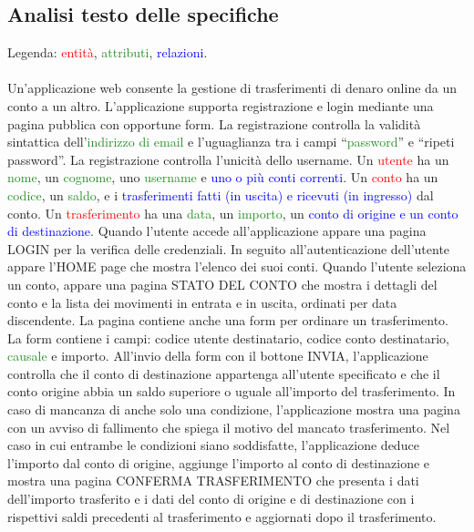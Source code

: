 \documentclass{article}
\begin{document}
\subsection{Analisi testo delle specifiche}
Legenda: \textcolor{red}{entità}, \textcolor{ForestGreen}{attributi}, \textcolor{blue}{relazioni}.
\\
\\
Un’applicazione web consente la gestione di trasferimenti di denaro online da un conto a un
altro. L’applicazione supporta registrazione e login mediante una pagina pubblica con
opportune form. La registrazione controlla la validità sintattica dell’\textcolor{ForestGreen}{indirizzo di email} e
l’uguaglianza tra i campi “\textcolor{ForestGreen}{password}” e “ripeti password”. La registrazione controlla l’unicità
dello username. Un \textcolor{red}{utente} ha un \textcolor{ForestGreen}{nome}, un \textcolor{ForestGreen}{cognome}, uno \textcolor{ForestGreen}{username} e \textcolor{blue}{uno o più conti correnti}.
Un \textcolor{red}{conto}  ha un \textcolor{ForestGreen}{codice}, un \textcolor{ForestGreen}{saldo}, e i \textcolor{blue}{trasferimenti fatti (in uscita) e ricevuti (in ingresso)} dal
conto. Un  \textcolor{red}{trasferimento} ha una \textcolor{ForestGreen}{data}, un \textcolor{ForestGreen}{importo}, un \textcolor{blue}{conto di origine e un conto di destinazione}.
Quando l’utente accede all’applicazione appare una pagina LOGIN per la verifica delle
credenziali. In seguito all’autenticazione dell’utente appare l’HOME page che mostra l’elenco
dei suoi conti. Quando l’utente seleziona un conto, appare una pagina STATO DEL CONTO
che mostra i dettagli del conto e la lista dei movimenti in entrata e in uscita, ordinati per data
discendente. La pagina contiene anche una form per ordinare un trasferimento. La form
contiene i campi: codice utente destinatario, codice conto destinatario, \textcolor{ForestGreen}{causale} e importo.
All’invio della form con il bottone INVIA, l’applicazione controlla che il conto di destinazione
appartenga all’utente specificato e che il conto origine abbia un saldo superiore o uguale
all’importo del trasferimento. In caso di mancanza di anche solo una condizione, l’applicazione
mostra una pagina con un avviso di fallimento che spiega il motivo del mancato trasferimento.
Nel caso in cui entrambe le condizioni siano soddisfatte, l’applicazione deduce l’importo dal
conto di origine, aggiunge l’importo al conto di destinazione e mostra una pagina CONFERMA
TRASFERIMENTO che presenta i dati dell’importo trasferito e i dati del conto di origine e di
destinazione con i rispettivi saldi precedenti al trasferimento e aggiornati dopo il trasferimento.
\end{document}
